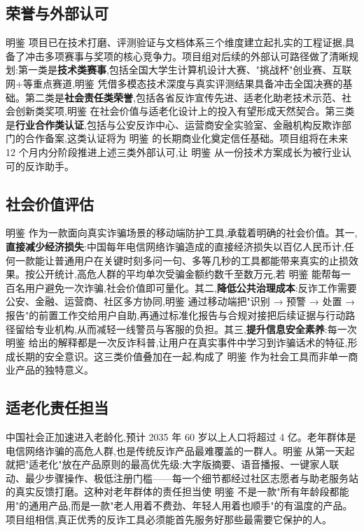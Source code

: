\documentclass[UTF8,a4paper,12pt]{ctexart}
\begin{document}
\subsection{荣誉与外部认可}

明鉴 项目已在技术打磨、评测验证与文档体系三个维度建立起扎实的工程证据,具备了冲击多项赛事与奖项的核心竞争力。项目组对后续的外部认可路径做了清晰规划:第一类是\textbf{技术类赛事},包括全国大学生计算机设计大赛、"挑战杯"创业赛、互联网+等重点赛道,明鉴 凭借多模态技术深度与真实评测结果具备冲击全国决赛的基础。第二类是\textbf{社会责任类荣誉},包括各省反诈宣传先进、适老化助老技术示范、社会创新类奖项,明鉴 在社会价值与适老化设计上的投入有望形成天然契合。第三类是\textbf{行业合作类认证},包括与公安反诈中心、运营商安全实验室、金融机构反欺诈部门的合作备案,这类认证将为 明鉴 的长期商业化奠定信任基础。项目组将在未来 12 个月内分阶段推进上述三类外部认可,让 明鉴 从一份技术方案成长为被行业认可的反诈助手。

\subsection{社会价值评估}

明鉴 作为一款面向真实诈骗场景的移动端防护工具,承载着明确的社会价值。其一,\textbf{直接减少经济损失}:中国每年电信网络诈骗造成的直接经济损失以百亿人民币计,任何一款能让普通用户在关键时刻多问一句、多等几秒的工具都能带来真实的止损效果。按公开统计,高危人群的平均单次受骗金额约数千至数万元,若 明鉴 能帮每一百名用户避免一次诈骗,社会价值即可量化。其二,\textbf{降低公共治理成本}:反诈工作需要公安、金融、运营商、社区多方协同,明鉴 通过移动端把"识别 → 预警 → 处置 → 报告"的前置工作交给用户自助,再通过标准化报告与合规对接把后续证据与行动路径留给专业机构,从而减轻一线警员与客服的负担。其三,\textbf{提升信息安全素养}:每一次 明鉴 给出的解释都是一次反诈科普,让用户在真实事件中学习到诈骗话术的特征,形成长期的安全意识。这三类价值叠加在一起,构成了 明鉴 作为社会工具而非单一商业产品的独特意义。

\subsection{适老化责任担当}

中国社会正加速进入老龄化,预计 2035 年 60 岁以上人口将超过 4 亿。老年群体是电信网络诈骗的高危人群,也是传统反诈产品最难覆盖的一群人。明鉴 从第一天起就把"适老化"放在产品原则的最高优先级:大字版摘要、语音播报、一键家人联动、最少步骤操作、极低注册门槛——每一个细节都经过社区志愿者与助老服务站的真实反馈打磨。这种对老年群体的责任担当使 明鉴 不是一款"所有年龄段都能用"的通用产品,而是一款"老人用着不费劲、年轻人用着也顺手"的有温度的产品。项目组相信,真正优秀的反诈工具必须能首先服务好那些最需要它保护的人。
\end{document}
